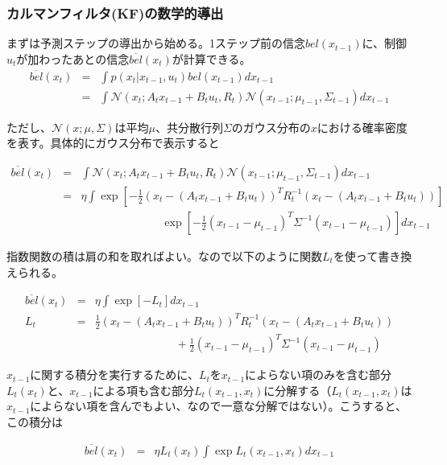 \documentclass{jarticle}
\begin{document}
 
\setcounter{section}{3}
\setcounter{subsection}{2}
\setcounter{subsubsection}{3}
\subsubsection{カルマンフィルタ(KF)の数学的導出}
まずは予測ステップの導出から始める。1ステップ前の信念$bel(x_{t-1})$に、制御$u_t$が加わったあとの信念$\overline{bel}(x_t) $が計算できる。
\begin{eqnarray}
\overline{bel}(x_t) &=& \int p(x_t | x_{t-1}, u_t) bel(x_{t-1}) dx_{t-1} \\
&=&\int \mathcal{N}(x_t; A_t x_{t-1} + B_t u_t, R_t) \mathcal{N}(x_{t-1}; \mu _{t-1}, \Sigma _{t-1}) dx_{t-1}
\end{eqnarray}

ただし、$ \mathcal{N}(x; \mu, \Sigma )$は平均$\mu$、共分散行列$\Sigma$のガウス分布の$x$における確率密度を表す。具体的にガウス分布で表示すると

\begin{eqnarray}
\overline{bel}(x_t) &=&\int \mathcal{N}(x_t; A_t x_{t-1} + B_t u_t, R_t) \mathcal{N}(x_{t-1}; \mu _{t-1}, \Sigma _{t-1}) dx_{t-1}\\
&=& \eta \int \exp[-\frac{1}{2}(x_t - (A_t x_{t-1} + B_t u_t))^T R_t ^{-1}(x_t - (A_t x_{t-1} + B_t u_t)) ] \nonumber \\
&& \hspace{3cm} \exp[-\frac{1}{2} (x_{t-1}-\mu _{t-1})^T  \Sigma ^{-1}  (x_{t-1}-\mu _{t-1})]dx_{t-1}
\end{eqnarray}

指数関数の積は肩の和を取ればよい。なので以下のように関数$L_t$を使って書き換えられる。

\begin{eqnarray}
\overline{bel}(x_t) &=& \eta \int \exp[-L_t] dx_{t-1}\\
 L_t &=&\frac{1}{2}(x_t - (A_t x_{t-1} + B_t u_t))^T R_t ^{-1}(x_t - (A_t x_{t-1} + B_t u_t)) \nonumber  \\
 && \hspace{3cm}+\frac{1}{2} (x_{t-1}-\mu _{t-1})^T  \Sigma ^{-1}  (x_{t-1}-\mu _{t-1})
\end{eqnarray}

$x_{t-1}$に関する積分を実行するために、$L_t$を$x_{t-1}$によらない項のみを含む部分$L_t (x_t)$と、$x_{t-1}$による項も含む部分$L_t (x_{t-1},x_t)$に分解する（$L_t (x_{t-1},x_t)$は$x_{t-1}$によらない項を含んでもよい、なので一意な分解ではない）。こうすると、この積分は

\begin{eqnarray}
\overline{bel}(x_t) &=& \eta L_t (x_t)  \int \exp L_t (x_{t-1},x_t)dx_{t-1}\\
\end{eqnarray}
\end{document}

